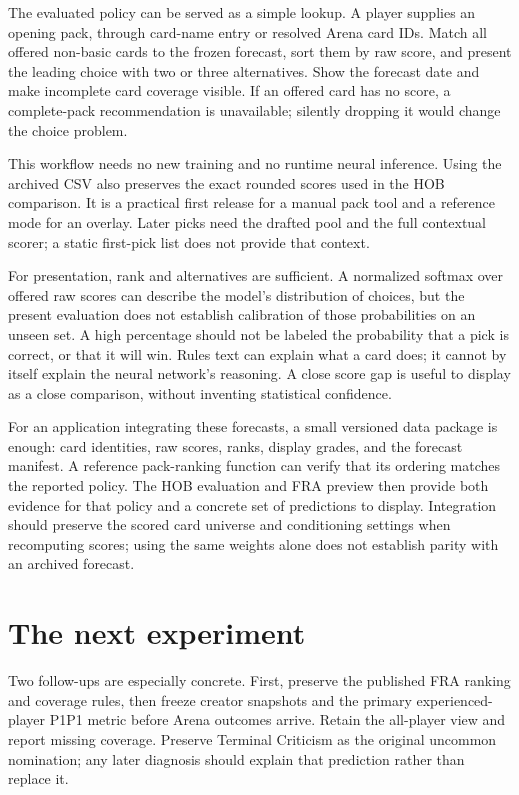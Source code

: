 \documentclass[11pt]{article}
\begin{document}
The evaluated policy can be served as a simple lookup. A player supplies
an opening pack, through card-name entry or resolved Arena card IDs. Match
all offered non-basic cards to the frozen forecast, sort them by raw score,
and present the leading choice with two or three alternatives. Show the
forecast date and make incomplete card coverage visible. If an offered
card has no score, a complete-pack recommendation is unavailable; silently
dropping it would change the choice problem.

This workflow needs no new training and no runtime neural inference.
Using the archived CSV also preserves the exact rounded scores used in
the HOB comparison. It is a practical first release for a manual pack tool
and a reference mode for an overlay. Later picks need the drafted pool and
the full contextual scorer; a static first-pick list does not provide that
context.

For presentation, rank and alternatives are sufficient. A normalized
softmax over offered raw scores can describe the model's distribution of
choices, but the present evaluation does not establish calibration of those
probabilities on an unseen set. A high percentage should not be labeled
the probability that a pick is correct, or that it will win. Rules text can
explain what a card does; it cannot by itself explain the neural network's
reasoning. A close score gap is useful to display as a close comparison,
without inventing statistical confidence.

For an application integrating these forecasts, a small versioned data
package is enough: card identities, raw scores, ranks, display grades, and
the forecast manifest. A reference pack-ranking function can verify that
its ordering matches the reported policy. The HOB evaluation and FRA preview
then provide both evidence for that policy and a concrete set of predictions
to display. Integration should preserve the scored card universe and
conditioning settings when recomputing scores; using the same weights alone
does not establish parity with an archived forecast.

\section{The next experiment}

Two follow-ups are especially concrete. First, preserve the published FRA
ranking and coverage rules, then freeze creator snapshots and the primary
experienced-player P1P1 metric before Arena outcomes arrive. Retain the all-player view and report missing
coverage. Preserve Terminal Criticism as the original uncommon nomination;
any later diagnosis should explain that prediction rather than replace it.
\end{document}
